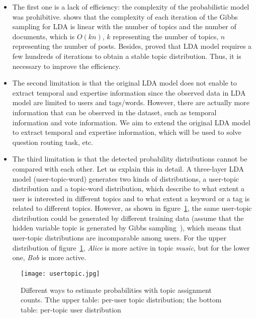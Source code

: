 \begin{itemize}
\item The first one is a lack of efficiency: the complexity of the probabilistic model was prohibitive. \cite{chp7ldatimecomplexity} shows that the complexity of each iteration of the Gibbs sampling for LDA is linear with the number of topics and the number of documents, which is $O(kn)$, $k$ representing the number of topics, $n$ representing the number of posts. Besides, \cite{griffiths2004finding} proved that LDA model requires a few hundreds of iterations to obtain a stable topic distribution. Thus, it is necessary to improve the efficiency.

\item The second limitation is that the original LDA model does not enable to extract temporal and expertise information since the observed data in LDA model are limited to users and tags/words. However, there are actually more information that can be observed in the dataset, such as temporal information and vote information. We aim to extend the original LDA model to extract temporal and expertise information, which will be used to solve question routing task, etc.

\item The third limitation is that the detected probability distributions cannot be compared with each other.  Let us explain this in detail. A three-layer LDA model (user-topic-word) generates two kinds of distributions, a user-topic distribution and a topic-word distribution, which describe to what extent a user is interested in different topics and to what extent a keyword or a tag is related to different topics. 
However, as shown in figure~\ref{fig:usertopic}, the same user-topic distribution could be generated by different training data (assume that the hidden variable topic is generated by Gibbs sampling~\cite{griffiths2004finding}), which means that user-topic distributions are incomparable among users. For the upper distribution of figure~\ref{fig:usertopic}, \emph{Alice} is more active in topic \emph{music}, but for the lower one, \emph{Bob} is more active. 


\end{itemize}

\begin{figure}
\centering
\texttt{[image: usertopic.jpg]}  
\caption{Different ways to estimate probabilities with topic assignment counts. Tthe upper table: per-user topic distribution; the bottom table: per-topic user distribution}
\label{fig:usertopic} 
\end{figure}


